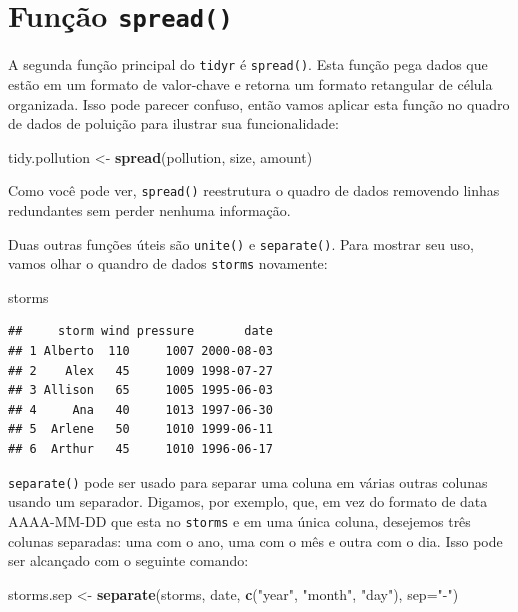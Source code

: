 \documentclass[a4paper]{book}
\newenvironment{Shaded}{\begin{snugshade}}{\end{snugshade}}
\newcommand{\DataTypeTok}[1]{\textcolor[rgb]{0.13,0.29,0.53}{#1}}
\newcommand{\KeywordTok}[1]{\textcolor[rgb]{0.13,0.29,0.53}{\textbf{#1}}}
\newcommand{\NormalTok}[1]{#1}
\newcommand{\StringTok}[1]{\textcolor[rgb]{0.31,0.60,0.02}{#1}}
\begin{document}
\hypertarget{funuxe7uxe3o-spread}{%
\section{\texorpdfstring{Função \texttt{spread()}}{Função spread()}}\label{funuxe7uxe3o-spread}}

A segunda função principal do \texttt{tidyr} é \texttt{spread()}. Esta função pega dados que estão em um formato de valor-chave e retorna um formato retangular de célula organizada. Isso pode parecer confuso, então vamos aplicar esta função no quadro de dados de poluição para ilustrar sua funcionalidade:

\begin{Shaded}
\begin{Highlighting}[]
\NormalTok{tidy.pollution <-}\StringTok{ }\KeywordTok{spread}\NormalTok{(pollution, size, amount)}
\end{Highlighting}
\end{Shaded}

Como você pode ver, \texttt{spread()} reestrutura o quadro de dados removendo linhas redundantes sem perder nenhuma informação.

Duas outras funções úteis são \texttt{unite()} e \texttt{separate()}. Para mostrar seu uso, vamos olhar o quandro de dados \texttt{storms} novamente:

\begin{Shaded}
\begin{Highlighting}[]
\NormalTok{storms}
\end{Highlighting}
\end{Shaded}

\begin{verbatim}
##     storm wind pressure       date
## 1 Alberto  110     1007 2000-08-03
## 2    Alex   45     1009 1998-07-27
## 3 Allison   65     1005 1995-06-03
## 4     Ana   40     1013 1997-06-30
## 5  Arlene   50     1010 1999-06-11
## 6  Arthur   45     1010 1996-06-17
\end{verbatim}

\texttt{separate()} pode ser usado para separar uma coluna em várias outras colunas usando um separador. Digamos, por exemplo, que, em vez do formato de data AAAA-MM-DD que esta no \texttt{storms} e em uma única coluna, desejemos três colunas separadas: uma com o ano, uma com o mês e outra com o dia. Isso pode ser alcançado com o seguinte comando:

\begin{Shaded}
\begin{Highlighting}[]
\NormalTok{storms.sep <-}\StringTok{ }\KeywordTok{separate}\NormalTok{(storms, date, }\KeywordTok{c}\NormalTok{(}\StringTok{"year"}\NormalTok{, }\StringTok{"month"}\NormalTok{, }\StringTok{"day"}\NormalTok{), }\DataTypeTok{sep=}\StringTok{"-"}\NormalTok{)}
\end{Highlighting}
\end{Shaded}
\end{document}

